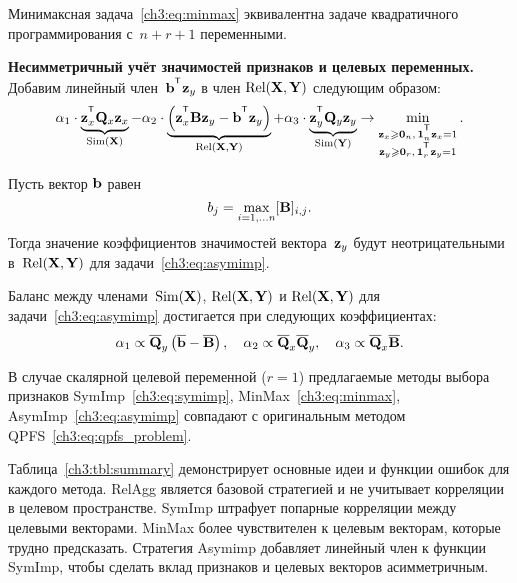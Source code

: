 \documentclass[11pt, a5paper]{dissert}
\begin{document}
\begin{statement}
	Минимаксная задача~\eqref{ch3:eq:minmax} эквивалентна задаче квадратичного программирования с~$n + r + 1$ переменными.
\end{statement}

\textbf{Несимметричный учёт значимостей признаков и целевых переменных.}
Добавим линейный член~$\bb^{\T} \bz_y$ в член $\text{Rel}(\mathbf{X}, \mathbf{Y})$ следующим образом:
\begin{equation}
	\alpha_1 \cdot \underbrace{\bz_x^{\T} \bQ_x \bz_x}_{\text{Sim}(\bX)} - \alpha_2 \cdot  \underbrace{\left(\bz_x^{\T} \bB \bz_y - \bb^{\T} \bz_y \right) }_{\text{Rel}(\bX, \bY)} + \alpha_3 \cdot \underbrace{\bz_y^{\T} \bQ_y \bz_y}_{\text{Sim}(\bY)} \rightarrow \min_{\substack{\bz_x \geq \bZero_n, \, \bOne_n^{\T}\bz_x=1 \\ \bz_y \geq \bZero_r, \, \bOne_r^{\T}\bz_y=1}}.
	\label{ch3:eq:asymimp}
\end{equation}

\begin{statement}
	Пусть вектор $\mathbf{b}$ равен
	\begin{equation*}
	b_j = \max_{i=1, \dots n} [\mathbf{B}]_{i, j}.
	\end{equation*}
	Тогда значение коэффициентов значимостей вектора~$\mathbf{z}_y$ будут неотрицательными в~$\text{Rel}(\mathbf{X}, \mathbf{Y})$ для задачи~\eqref{ch3:eq:asymimp}.
\end{statement}

\begin{statement}
	Баланс между членами~$\text{Sim}(\mathbf{X})$, $\text{Rel}(\mathbf{X}, \mathbf{Y})$ и $\text{Rel}(\mathbf{X}, \mathbf{Y})$ для задачи~\eqref{ch3:eq:asymimp} достигается при следующих коэффициентах:
	\begin{equation*}
		\alpha_1 \propto \overline{\mathbf{Q}}_y \left( \overline{\mathbf{b}} - \overline{\mathbf{B}}\right), \quad
		\alpha_2 \propto \overline{\mathbf{Q}}_x \overline{\mathbf{Q}}_y, \quad
		\alpha_3  \propto \overline{\mathbf{Q}}_x \overline{\mathbf{B}}.
	\end{equation*}
\end{statement}

\begin{theorem}
	В случае скалярной целевой переменной ($r=1$) предлагаемые методы выбора признаков SymImp~\eqref{ch3:eq:symimp}, MinMax~\eqref{ch3:eq:minmax}, AsymImp~\eqref{ch3:eq:asymimp} совпадают с оригинальным методом QPFS~\eqref{ch3:eq:qpfs_problem}.
\end{theorem}

Таблица~\ref{ch3:tbl:summary} демонстрирует основные идеи и функции ошибок для каждого метода. 
RelAgg является базовой стратегией и не учитывает корреляции в целевом пространстве.
SymImp штрафует попарные корреляции между целевыми векторами.
MinMax более чувствителен к целевым векторам, которые трудно предсказать.
Стратегия Asymimp добавляет линейный член к функции SymImp, чтобы сделать вклад признаков и целевых векторов асимметричным.
\end{document}
